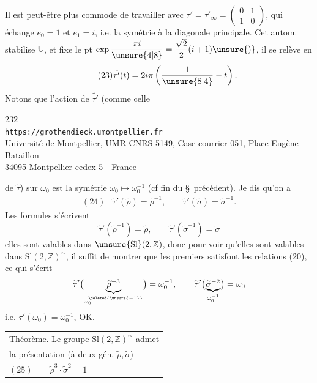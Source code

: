  Il est peut-être plus commode de travailler avec
$\tau'=\tau'_\infty=\begin{pmatrix}0&1\\1&0\end{pmatrix}$,
qui  échange $e_0=1$ et $e_1=i$,
i.e. la symétrie  à la diagonale principale.
Cet autom. stabilise $\mathbb U$, et fixe le pt
$\exp\dfrac{\pi i}{\unsure{4|8}}=\dfrac{\sqrt2}{2}(i+1)\unsure{)}$,
il se relève en
\[
\tag{23}
\widetilde{\tau'}(t)=2i\pi\left(\frac1{\unsure{8|4}}-t\right).
\]
Notons que 
l'action de $\widetilde{\tau'}$ (comme celle


\begin{center}
232\\
\texttt{https://grothendieck.umontpellier.fr}\\
Université de Montpellier, UMR CNRS 5149, Case courrier 051, Place Eugène Bataillon\\
34095 Montpellier cedex 5 - France
\end{center}

de $\widetilde\tau$) sur $\omega_0$ est la symétrie $\omega_0\mapsto\omega_0^{-1}$ (cf fin du \S\ précédent). Je dis qu'on a
\[
\begin{array}{ll}
(24)&\widetilde\tau'(\widetilde\rho)=\widetilde\rho^{-1},\qquad
\widetilde\tau'(\widetilde\sigma)=\widetilde\sigma^{-1}.
\end{array}
\]
Les formules s'écrivent 
\[
\widetilde\tau'(\widetilde\rho^{-1})=\widetilde\rho,\qquad
\widetilde\tau'(\widetilde\sigma^{-1})=\widetilde\sigma
\]
elles sont valables  dans $\unsure{\mathrm{Sl}}(2,\mathbb Z)$, donc pour voir qu'elles sont valables dans $\mathrm{Sl}(2,\mathbb Z)^{\sim}$, il suffit de montrer que les premiers  satisfont les relations  (20), ce qui s'écrit
\[
\widetilde\tau'\bigl(\underbrace{\widetilde\rho^{-3}}_{\omega_0^{\deleted{\unsure{-1}}}}\bigr)=\omega_0^{-1},\qquad
\widetilde\tau'\bigl(\underbrace{\widetilde\sigma^{-2}}_{\omega_0^{-1}}\bigr)=\omega_0
\]
i.e. $\widetilde\tau'(\omega_0)=\omega_0^{-1}$, OK.

\begin{tabular}{|l}
\uline{Théorème.} Le groupe $\mathrm{Sl}(2,\mathbb Z)^{\sim}$ admet\\
la présentation (à deux gén. $\widetilde\rho,\widetilde\sigma$)\\[3pt]
$(25)\qquad\boxed{\widetilde\rho^3\cdot\widetilde\sigma^2=1}$
\end{tabular}

